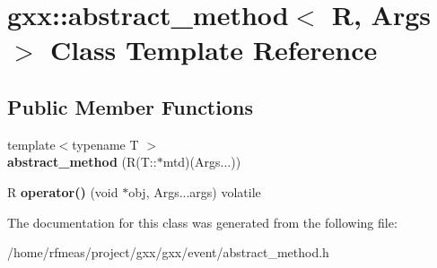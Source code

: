 \hypertarget{classgxx_1_1abstract__method}{}\section{gxx\+:\+:abstract\+\_\+method$<$ R, Args $>$ Class Template Reference}
\label{classgxx_1_1abstract__method}
\subsection*{Public Member Functions}
\begin{DoxyCompactItemize}
\item 
{\footnotesize template$<$typename T $>$ }\\{\bfseries abstract\+\_\+method} (R(T\+::$\ast$mtd)(Args...))\hypertarget{classgxx_1_1abstract__method_a4b7ac075bf54183b9b1c42fcebebd145}{}\label{classgxx_1_1abstract__method_a4b7ac075bf54183b9b1c42fcebebd145}

\item 
R {\bfseries operator()} (void $\ast$obj, Args...\+args) volatile\hypertarget{classgxx_1_1abstract__method_afa4d1fc3928507e7d28c890fa956945b}{}\label{classgxx_1_1abstract__method_afa4d1fc3928507e7d28c890fa956945b}

\end{DoxyCompactItemize}


The documentation for this class was generated from the following file\+:\begin{DoxyCompactItemize}
\item 
/home/rfmeas/project/gxx/gxx/event/abstract\+\_\+method.\+h\end{DoxyCompactItemize}

